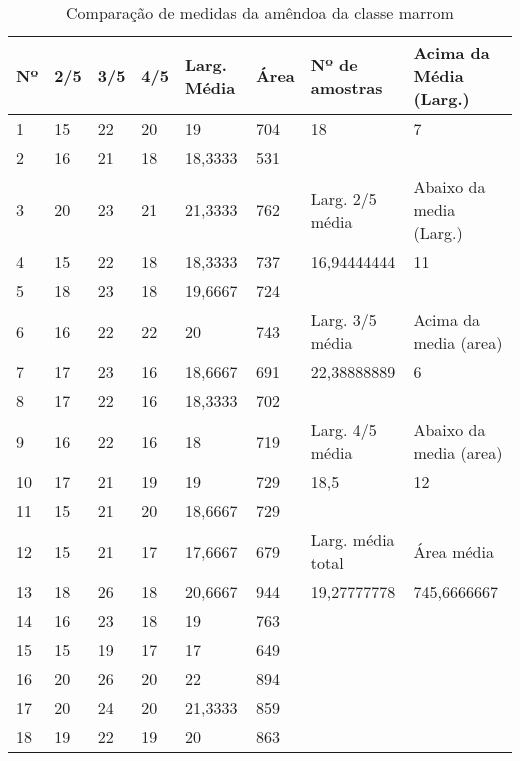 \begin{anexosenv}
\begin{table}[hbtp!]
\centering
\caption{Comparação de medidas da amêndoa da classe marrom}
\label{tab:medidas_classe_marrom}
\begin{tabular}{|l|l|l|l|l|l|l|l|}
\hline
Nº & 2/5 & 3/5 & 4/5 & Larg. Média & Área & Nº de amostras & Acima da Média (Larg.) \\ \hline
1  & 15  & 22  & 20  & 19          & 704  & 18               & 7                      \\
2  & 16  & 21  & 18  & 18,3333     & 531  &                  &                        \\\cline{7-8}
3  & 20  & 23  & 21  & 21,3333     & 762  & \multicolumn{1}{l|}{Larg. 2/5 média}   & \multicolumn{1}{l|}{Abaixo da media (Larg.)} \\\cline{7-8}
4  & 15  & 22  & 18  & 18,3333     & 737  & 16,94444444      & 11                     \\
5  & 18  & 23  & 18  & 19,6667     & 724  &                  &                        \\\cline{7-8}
6  & 16  & 22  & 22  & 20          & 743  & \multicolumn{1}{l|}{Larg. 3/5 média}   & \multicolumn{1}{l|}{Acima da media (area)}  \\\cline{7-8}
7  & 17  & 23  & 16  & 18,6667     & 691  & 22,38888889      & 6                      \\
8  & 17  & 22  & 16  & 18,3333     & 702  &                  &                        \\\cline{7-8}
9  & 16  & 22  & 16  & 18          & 719  & \multicolumn{1}{l|}{Larg. 4/5 média}   & \multicolumn{1}{l|}{Abaixo da media (area)} \\\cline{7-8}
10 & 17  & 21  & 19  & 19          & 729  & 18,5             & 12                     \\
11 & 15  & 21  & 20  & 18,6667     & 729  &                  &                        \\\cline{7-8}
12 & 15  & 21  & 17  & 17,6667     & 679  & Larg. média total & \multicolumn{1}{l|}{Área média}             \\\cline{7-8}
13 & 18  & 26  & 18  & 20,6667     & 944  & 19,27777778      & 745,6666667            \\
14 & 16  & 23  & 18  & 19          & 763  &                  &                        \\
15 & 15  & 19  & 17  & 17          & 649  &                  &                        \\
16 & 20  & 26  & 20  & 22          & 894  &                  &                        \\
17 & 20  & 24  & 20  & 21,3333     & 859  &                  &                        \\
18 & 19  & 22  & 19  & 20          & 863  &                  &                       \\\hline
\end{tabular}
\end{table}



\end{anexosenv}

